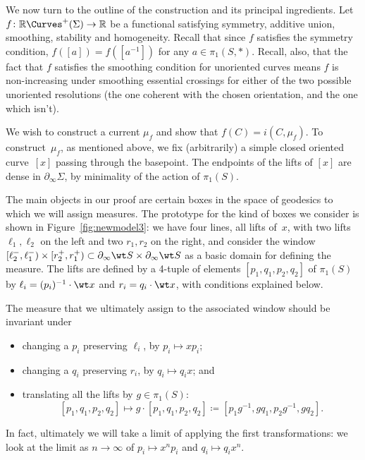 We now turn to the outline of the construction and its principal
ingredients.
Let $f\colon \mathbb{R}\Curves^+(\Sigma) \to \mathbb{R}$ be a
functional satisfying symmetry, additive union, smoothing, stability
and homogeneity.
Recall that since $f$ satisfies the symmetry condition,
$f([a])=f([a^{-1}])$ for any $a \in \pi_1(S,\ast)$.
Recall, also, that the fact that $f$ satisfies the smoothing condition
for unoriented curves means $f$ is non-increasing under smoothing
essential crossings for either of the two possible unoriented resolutions
(the one coherent with the chosen orientation, and the one which
isn't).

We wish to construct a current $\mu_f$ and show that
$f(C) = i(C, \mu_f)$. To construct~$\mu_f$, as mentioned above, we fix
(arbitrarily) a simple closed oriented curve~$[x]$ passing through the
basepoint. The endpoints of the lifts of $[x]$ are dense in
$\partial_{\infty} \Sigma$, by minimality of the action of $\pi_1(S)$.

The main objects in our proof are certain boxes in the
space of geodesics to which we will assign measures. The prototype for
the kind of boxes we consider is shown in
Figure~\ref{fig:newmodel3}: we have four lines, all lifts of~$x$, with
two lifts $\ell_1,\ell_2$ on the left and two $r_1,r_2$ on the right,
and consider the window
$[\ell_2^-,\ell_1^-) \times [r_2^+,r_1^+) \subset
\partial_\infty \wt S \times \partial_\infty \wt S$ as a basic domain
for defining the measure. The lifts are defined by a 4-tuple of
elements $[p_1,q_1,p_2,q_2]$ of $\pi_1(S)$ by
$\ell_i = (p_i)^{-1} \cdot \wt x$ and $r_i = q_i \cdot \wt x$, with
conditions explained below.

\begin{figure}
\end{figure}

The measure that we ultimately assign to the associated window should
be invariant under
\begin{itemize}
\item changing a $p_i$ preserving $\ell_i$, by $p_i \mapsto xp_i$;
\item changing a $q_i$ preserving $r_i$, by $q_i \mapsto q_ix$; and
\item translating all the lifts by $g \in \pi_1(S)$:
  \[
    [p_1,q_1,p_2,q_2] \mapsto g \cdot [p_1,q_1,p_2,q_2] \coloneqq
      [p_1 g^{-1}, gq_1, p_2 g^{-1},  gq_2].
  \]
\end{itemize}
In fact, ultimately we will take a limit of applying the first
transformations: we look at the limit as $n\to \infty$ of $p_i \mapsto x^np_i$
and $q_i \mapsto q_i x^n$.

